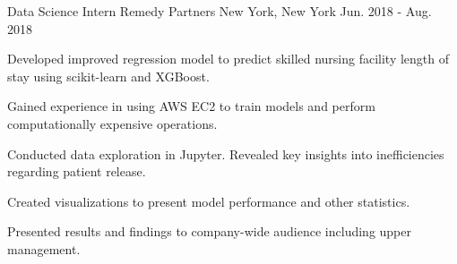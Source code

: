 \begin{cventries}
  \cventry
    {Data Science Intern} %
    {Remedy Partners} %
    {New York, New York} %
    {Jun. 2018 - Aug. 2018} %
    {
      \begin{cvitems} %
        \item {Developed improved regression model to predict skilled nursing facility length of stay using scikit-learn and XGBoost.}
        \item {Gained experience in using AWS EC2 to train models and perform computationally expensive operations.}
        \item {Conducted data exploration in Jupyter. Revealed key insights into inefficiencies regarding patient release.}
        \item {Created visualizations to present model performance and other statistics.}
        \item {Presented results and findings to company-wide audience including upper management.}
      \end{cvitems}
    }

\end{cventries}
